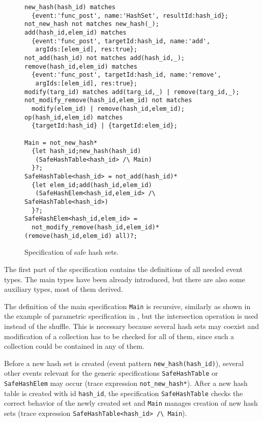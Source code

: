 \begin{figure}[h]
\begin{lstlisting}[basicstyle=\ttfamily\scriptsize]
new_hash(hash_id) matches
  {event:'func_post', name:'HashSet', resultId:hash_id};
not_new_hash not matches new_hash(_);
add(hash_id,elem_id) matches
  {event:'func_post', targetId:hash_id, name:'add',
   argIds:[elem_id], res:true};
not_add(hash_id) not matches add(hash_id,_);
remove(hash_id,elem_id) matches
  {event:'func_post', targetId:hash_id, name:'remove',
   argIds:[elem_id], res:true};
modify(targ_id) matches add(targ_id,_) | remove(targ_id,_);
not_modify_remove(hash_id,elem_id) not matches
  modify(elem_id) | remove(hash_id,elem_id);
op(hash_id,elem_id) matches
  {targetId:hash_id} | {targetId:elem_id};

Main = not_new_hash*
  {let hash_id;new_hash(hash_id)
   (SafeHashTable<hash_id> /\ Main)
  }?;
SafeHashTable<hash_id> = not_add(hash_id)*
  {let elem_id;add(hash_id,elem_id)
   (SafeHashElem<hash_id,elem_id> /\ SafeHashTable<hash_id>)
  }?;
SafeHashElem<hash_id,elem_id> = 
  not_modify_remove(hash_id,elem_id)* (remove(hash_id,elem_id) all)?;
\end{lstlisting}
\caption{Specification of safe hash sets.}\label{list:hash}
\end{figure}

The first part of the specification contains the definitions of all needed event types. The main types have been already introduced,
but there are also some auxiliary types, most of them derived.

The definition of the main specification \lstinline{Main} is recursive, similarly as shown in the example of parametric specification in
, but the intersection operation is used instead of the shuffle. This is necessary because several hash sets may
coexist and modification of a collection has to be checked for all of them, since such a collection could be contained in any of them.

Before a new hash set is created (event pattern \lstinline{new_hash(hash_id)}), several other events relevant for the generic specifications \lstinline{SafeHashTable} or  \lstinline{SafeHashElem} may occur (trace expression \lstinline{not_new_hash*}).
After a new hash table is created with id \lstinline{hash_id}, the specification \lstinline{SafeHashTable} checks the correct behavior of
the newly created set and \lstinline{Main} manages creation of new hash sets (trace expression \lstinline{SafeHashTable<hash_id> /\ Main}).

